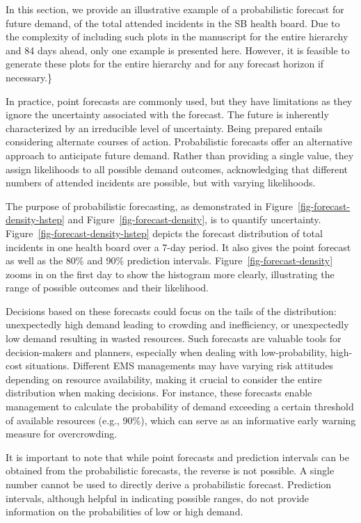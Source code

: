 \documentclass[
  authoryear,
  preprint,
  3p]{elsarticle}
\begin{document}
In this section, we provide an illustrative example of a probabilistic
forecast for future demand, of the total attended incidents in the SB
health board. Due to the complexity of including such plots in the
manuscript for the entire hierarchy and 84 days ahead, only one example
is presented here. However, it is feasible to generate these plots for
the entire hierarchy and for any forecast horizon if necessary.\}

In practice, point forecasts are commonly used, but they have
limitations as they ignore the uncertainty associated with the forecast.
The future is inherently characterized by an irreducible level of
uncertainty. Being prepared entails considering alternate courses of
action. Probabilistic forecasts offer an alternative approach to
anticipate future demand. Rather than providing a single value, they
assign likelihoods to all possible demand outcomes, acknowledging that
different numbers of attended incidents are possible, but with varying
likelihoods.

The purpose of probabilistic forecasting, as demonstrated in
Figure~\ref{fig-forecast-density-hstep} and
Figure~\ref{fig-forecast-density}, is to quantify uncertainty.
Figure~\ref{fig-forecast-density-hstep} depicts the forecast
distribution of total incidents in one health board over a 7-day period.
It also gives the point forecast as well as the 80\% and 90\% prediction
intervals. Figure~\ref{fig-forecast-density} zooms in on the first day
to show the histogram more clearly, illustrating the range of possible
outcomes and their likelihood.

Decisions based on these forecasts could focus on the tails of the
distribution: unexpectedly high demand leading to crowding and
inefficiency, or unexpectedly low demand resulting in wasted resources.
Such forecasts are valuable tools for decision-makers and planners,
especially when dealing with low-probability, high-cost situations.
Different EMS managements may have varying risk attitudes depending on
resource availability, making it crucial to consider the entire
distribution when making decisions. For instance, these forecasts enable
management to calculate the probability of demand exceeding a certain
threshold of available resources (e.g., 90\%), which can serve as an
informative early warning measure for overcrowding.

It is important to note that while point forecasts and prediction
intervals can be obtained from the probabilistic forecasts, the reverse
is not possible. A single number cannot be used to directly derive a
probabilistic forecast. Prediction intervals, although helpful in
indicating possible ranges, do not provide information on the
probabilities of low or high demand.
\end{document}
